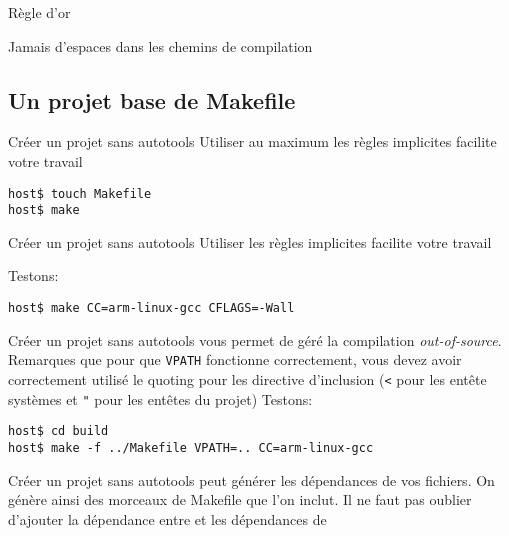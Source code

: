 \begin{frame}[fragile=singleslide]{Règle d'or}
  \begin{center}
    \huge{Jamais d'espaces dans les chemins de compilation}
  \end{center}
\end{frame}

\subsection{Un projet base de Makefile}

\begin{frame}[fragile=singleslide]{Créer un projet sans autotools}
  Utiliser au maximum les règles implicites facilite votre travail
\begin{lstlisting}
host$ touch Makefile
host$ make
\end{lstlisting} %
\end{frame}

\begin{frame}[fragile=singleslide]{Créer un projet sans autotools}
  Utiliser les règles implicites facilite votre travail
  
  Testons:
\begin{lstlisting}
host$ make CC=arm-linux-gcc CFLAGS=-Wall
\end{lstlisting} %
\end{frame}

\begin{frame}[fragile=singleslide]{Créer un projet sans autotools}
   vous permet de géré la compilation \emph{out-of-source}.
  Remarques que pour que \verb+VPATH+ fonctionne correctement, vous devez avoir
  correctement utilisé le quoting pour les directive d'inclusion (\verb+<+ pour
  les entête systèmes et \verb+"+ pour les entêtes du projet)
  Testons:
\begin{lstlisting}
host$ cd build
host$ make -f ../Makefile VPATH=.. CC=arm-linux-gcc
\end{lstlisting} %
\end{frame}

\begin{frame}[fragile=singleslide]{Créer un projet sans autotools}
   peut  générer les dépendances de vos  fichiers.  On génère
  ainsi  des morceaux  de Makefile  que l'on  inclut. Il  ne  faut pas
  oublier   d'ajouter  la  dépendance   entre     et  les
  dépendances de 
  
\end{frame}

